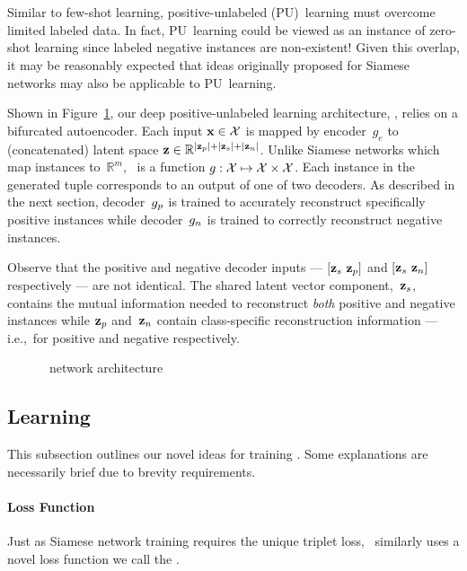 \section{\toolname}\label{sec:Toolname}

Similar to few-shot learning, positive-unlabeled (PU)~learning must overcome limited labeled data.  In fact, PU~learning could be viewed as an instance of zero-shot learning since labeled negative instances are non-existent!  Given this overlap, it may be reasonably expected that ideas originally proposed for Siamese networks may also be applicable to PU~learning.

Shown in Figure~\ref{fig:Toolname}, our deep positive-unlabeled learning architecture, \textit{\toolname}, relies on a bifurcated autoencoder.  Each input ${\mathbf{x}\in\mathcal{X}}$ is mapped by encoder~$g_e$ to (concatenated) latent space ${\mathbf{z}\in\mathbb{R}^{\lvert\mathbf{z}_{p}\rvert+\lvert\mathbf{z}_{s}\rvert+\lvert\mathbf{z}_{n}\rvert}}$. Unlike Siamese networks which map instances to~$\mathbb{R}^m$, \toolname\ is a function ${g:\mathcal{X}\mapsto\mathcal{X}\times\mathcal{X}}$.  Each instance in the generated tuple corresponds to an output of one of two decoders.  As described in the next section, decoder~$g_{p}$ is trained to accurately reconstruct specifically positive instances while decoder~$g_{n}$ is trained to correctly reconstruct negative instances.

Observe that the positive and negative decoder inputs --- ${\lbrack \mathbf{z}_{s}~\mathbf{z}_{p} \rbrack}$ and ${\lbrack \mathbf{z}_{s}~\mathbf{z}_{n} \rbrack}$ respectively --- are not identical.  The shared latent vector component,~$\mathbf{z}_{s}$, contains the mutual information needed to reconstruct \textit{both} positive and negative instances while $\mathbf{z}_{p}$ and~$\mathbf{z}_{n}$ contain class-specific reconstruction information --- i.e.,~for positive and negative respectively.

\begin{figure}[t]
  \centering
  
  \caption{\toolname\ network architecture}\label{fig:Toolname}
\end{figure}

\subsection{Learning}

This subsection outlines our novel ideas for training \toolname\@.  Some explanations are necessarily brief due to brevity requirements.

\paragraph{Loss Function} Just as Siamese network training requires the unique triplet loss, \toolname\ similarly uses a novel loss function we call the \textit{\attLossLow}.

